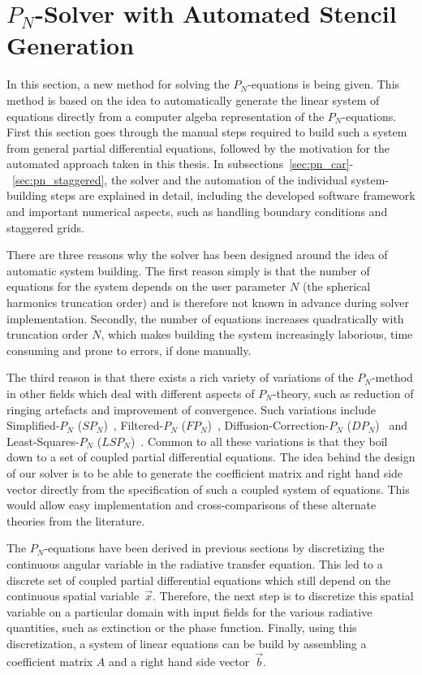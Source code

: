 \section{$P_N$-Solver with Automated Stencil Generation}
\label{sec:pn_solver}

In this section, a new method for solving the $P_N$-equations is being given. This method is based on the idea to automatically generate the linear system of equations directly from a computer algeba representation of the $P_N$-equations. First this section goes through the manual steps required to build such a system from general partial differential equations, followed by the motivation for the automated approach taken in this thesis. In subsections~\ref{sec:pn_car}-~\ref{sec:pn_staggered}, the solver and the automation of the individual system-building steps are explained in detail, including the developed software framework and important numerical aspects, such as handling boundary conditions and staggered grids.

There are three reasons why the solver has been designed around the idea of automatic system building. The first reason simply is that the number of equations for the system depends on the user parameter $N$ (the spherical harmonics truncation order) and is therefore not known in advance during solver implementation. Secondly, the number of equations increases quadratically with truncation order $N$, which makes building the system increasingly laborious, time consuming and prone to errors, if done manually.

The third reason is that there exists a rich variety of variations of the $P_N$-method in other fields which deal with different aspects of $P_N$-theory, such as reduction of ringing artefacts and improvement of convergence. Such variations include Simplified-$P_N$ ($SP_N$)~\cite{Ryan10}, Filtered-$P_N$ ($FP_N$)~\cite{Radice13}, Diffusion-Correction-$P_N$ ($DP_N$)~\cite{Schaefer11} and Least-Squares-$P_N$ ($LSP_N$)~\cite{Hansen14}. Common to all these variations is that they boil down to a set of coupled partial differential equations. The idea behind the design of our solver is to be able to generate the coefficient matrix and right hand side vector directly from the specification of such a coupled system of equations. This would allow easy implementation and cross-comparisons of these alternate theories from the literature.

The $P_N$-equations have been derived in previous sections by discretizing the continuous angular variable in the radiative transfer equation. This led to a discrete set of coupled partial differential equations which still depend on the continuous spatial variable~$\vec{x}$. Therefore, the next step is to discretize this spatial variable on a particular domain with input fields for the various radiative quantities, such as extinction or the phase function. Finally, using this discretization, a system of linear equations can be build by assembling a coefficient matrix $A$ and a right hand side vector~$\vec{b}$.

